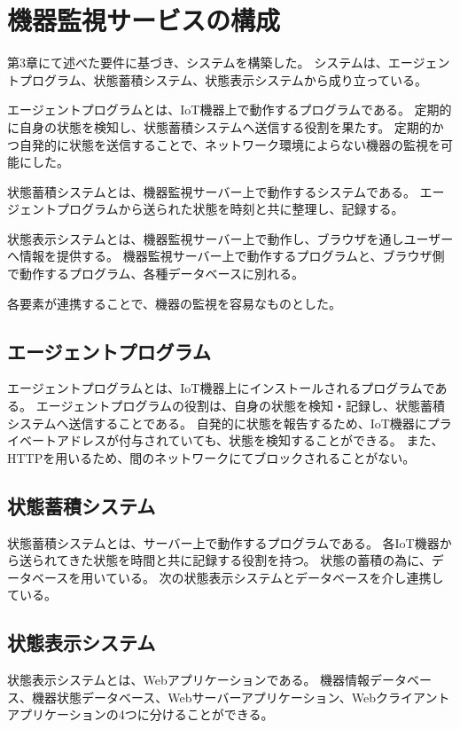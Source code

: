\section{機器監視サービスの構成}
第3章にて述べた要件に基づき、システムを構築した。
システムは、エージェントプログラム、状態蓄積システム、状態表示システムから成り立っている。
\medskip

エージェントプログラムとは、IoT機器上で動作するプログラムである。
定期的に自身の状態を検知し、状態蓄積システムへ送信する役割を果たす。
定期的かつ自発的に状態を送信することで、ネットワーク環境によらない機器の監視を可能にした。
\medskip

状態蓄積システムとは、機器監視サーバー上で動作するシステムである。
エージェントプログラムから送られた状態を時刻と共に整理し、記録する。
\medskip

状態表示システムとは、機器監視サーバー上で動作し、ブラウザを通しユーザーへ情報を提供する。
機器監視サーバー上で動作するプログラムと、ブラウザ側で動作するプログラム、各種データベースに別れる。
\medskip

各要素が連携することで、機器の監視を容易なものとした。

\subsection{エージェントプログラム}
エージェントプログラムとは、IoT機器上にインストールされるプログラムである。
エージェントプログラムの役割は、自身の状態を検知・記録し、状態蓄積システムへ送信することである。
自発的に状態を報告するため、IoT機器にプライベートアドレスが付与されていても、状態を検知することができる。
また、HTTPを用いるため、間のネットワークにてブロックされることがない。

\subsection{状態蓄積システム}
状態蓄積システムとは、サーバー上で動作するプログラムである。
各IoT機器から送られてきた状態を時間と共に記録する役割を持つ。
状態の蓄積の為に、データベースを用いている。
次の状態表示システムとデータベースを介し連携している。

\subsection{状態表示システム}
状態表示システムとは、Webアプリケーションである。
機器情報データベース、機器状態データベース、Webサーバーアプリケーション、Webクライアントアプリケーションの4つに分けることができる。
\medskip

